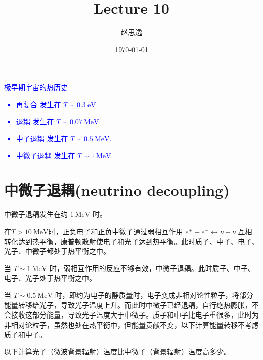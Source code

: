 \documentclass[12pt]{ctexart}
\title{Lecture 10}
\author{赵思逸}
\date{\today}
\newcommand{\new}[1]{\textcolor{blue}{#1}}
\begin{document}
\maketitle
\new{
极早期宇宙的热历史
\begin{itemize}
    \item 再复合 发生在 $T \sim 0.3 \mathrm{~eV}$.
    \item \ce{^{4}He} 退耦 发生在 $T \sim 0.07 \mathrm{~MeV}$.
    \item 中子退耦 发生在 $T \sim 0.5 \mathrm{~MeV}$.
    \item 中微子退耦 发生在 $T \sim 1 \mathrm{~MeV}$.
\end{itemize}
}

\section{中微子退耦(neutrino decoupling)}

中微子退耦发生在约 $1 \mathrm{~MeV}$ 时。

在$T> 10 \mathrm{~MeV}$时，正负电子和正负中微子通过弱相互作用 $e^+ + e^- \leftrightarrow \nu + \bar{\nu}$ 互相转化达到热平衡，康普顿散射使电子和光子达到热平衡。此时质子、中子、电子、光子、中微子都处于热平衡之中。

当 $T \sim 1 \mathrm{~MeV}$ 时，弱相互作用的反应不够有效，中微子退耦。此时质子、中子、电子、光子处于热平衡之中。

当 $T \sim 0.5 \mathrm{~MeV}$ 时，即约为电子的静质量时，电子变成非相对论性粒子，将部分能量转移给光子，导致光子温度上升。而此时中微子已经退耦，自行绝热膨胀，不会接收这部分能量，导致光子温度大于中微子。质子和中子比电子重很多，此时为非相对论粒子，虽然也处在热平衡中，但能量贡献不变，以下计算能量转移不考虑质子和中子。

以下计算光子（微波背景辐射）温度比中微子（背景辐射）温度高多少。
\end{document}
